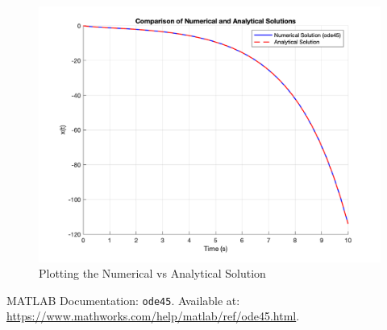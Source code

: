 \documentclass[12pt]{article}
\begin{document}
\begin{enumerate}
\begin{enumerate}
  \begin{figure}[H]
    \centering
    \includegraphics[width=\textwidth]{Figures/figure51.png}
    \caption{Plotting the Numerical vs Analytical Solution}
    \label{fig:figure51}
  \end{figure}

  \end{enumerate}
\newpage

\end{enumerate}

\pagebreak

\begin{thebibliography}{9}
  MATLAB Documentation: \texttt{ode45}. Available at: 
  \url{https://www.mathworks.com/help/matlab/ref/ode45.html}.
\end{thebibliography}
\end{document}
